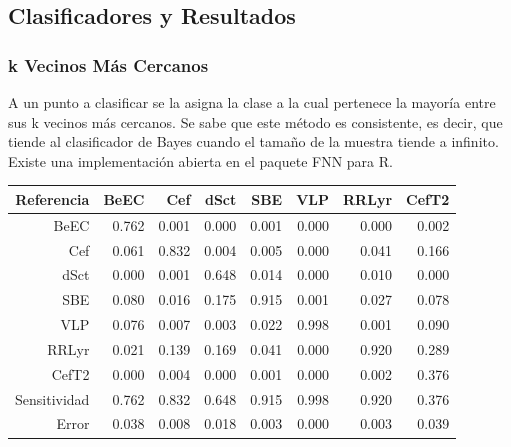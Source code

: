 \documentclass{beamer}
\begin{document}
\subsection{Clasificadores y Resultados}
\begin{frame}%
  \frametitle{k Vecinos Más Cercanos}
A un punto a clasificar se la asigna la clase a la cual pertenece la mayoría entre sus k vecinos más cercanos. Se sabe que este método es consistente, es decir, que tiende al clasificador de Bayes cuando el tamaño de la muestra tiende a infinito. Existe una implementación abierta en el paquete FNN para R.

\begin{table}[ht]
  \centering
  \resizebox{0.7\textwidth}{!} {
    \begin{tabular}{rrrrrrrr}
      \hline
      \hline
      Referencia& BeEC & Cef & dSct & SBE & VLP & RRLyr & CefT2 \\ 
      \hline
      \hline
      BeEC & 0.762 & 0.001 & 0.000 & 0.001 & 0.000 & 0.000 & 0.002 \\ 
      Cef & 0.061 & 0.832 & 0.004 & 0.005 & 0.000 & 0.041 & 0.166 \\ 
      dSct & 0.000 & 0.001 & 0.648 & 0.014 & 0.000 & 0.010 & 0.000 \\ 
      SBE & 0.080 & 0.016 & 0.175 & 0.915 & 0.001 & 0.027 & 0.078 \\ 
      VLP & 0.076 & 0.007 & 0.003 & 0.022 & 0.998 & 0.001 & 0.090 \\ 
      RRLyr & 0.021 & 0.139 & 0.169 & 0.041 & 0.000 & 0.920 & 0.289 \\ 
      CefT2 & 0.000 & 0.004 & 0.000 & 0.001 & 0.000 & 0.002 & 0.376 \\ 
      \hline
      \hline
      Sensitividad & 0.762 & 0.832 & 0.648 & 0.915 & 0.998 & 0.920 & 0.376 \\ 
      \hline
      Error & 0.038 & 0.008 & 0.018 & 0.003 & 0.000 & 0.003 & 0.039 \\ 
      \hline
      \hline
    \end{tabular}
  }
\end{table}
\end{frame}
\end{document}
